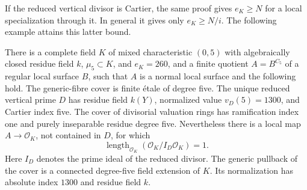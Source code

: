 If the reduced vertical divisor is Cartier, the same proof gives
$e_K\ge N$ for a local specialization through it. In general it gives
only $e_K\ge N/i$. The following example attains this latter bound.

\begin{example}
\label{ex:noncartier-quotient-specialization}
There is a complete field $K$ of mixed characteristic $(0,5)$ with
algebraically closed residue field $k$, $\mu_5\subset K$, and $e_K=260$,
and a finite quotient $A=B^{C_5}$ of a regular local surface $B$, such
that $A$ is a normal local surface and the following hold.
The generic-fibre cover is finite \'etale of degree five.
The unique reduced vertical prime $D$ has residue field $k(Y)$,
normalized value $v_D(5)=1300$, and Cartier index five.
The cover of divisorial valuation rings has ramification index one and
purely inseparable residue degree five.
Nevertheless there is a local map $A\to\mathcal O_K$, not contained in
$D$, for which
\[
            \operatorname{length}_{\mathcal O_K}
            (\mathcal O_K/I_D\mathcal O_K)=1.
\]
Here $I_D$ denotes the prime ideal of the reduced divisor.
The generic pullback of the cover is a connected degree-five field
extension of $K$. Its normalization has absolute index $1300$ and
residue field $k$.
\end{example}

